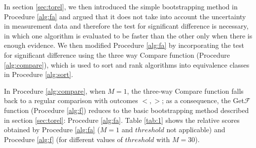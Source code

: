 \documentclass[conference]{IEEEtran}
\newcommand{\p}[1]{{\color{blue} Pdj: #1}}
\begin{document}
In section \ref{sec:torel}, we then introduced the simple bootstrapping method in Procedure \ref{alg:fa} and argued that it does not take into account the uncertainty in measurement data and therefore the test for significant difference is necessary, in which one algorithm is evaluated to be faster than the other only when there is enough evidence. We then modified Procedure \ref{alg:fa} by incorporating the test for significant difference using the three way Compare function (Procedure \ref{alg:compare}), which is used to sort and rank algorithms into equivalence classes in Procedure \ref{alg:sort}. 
 
In Procedure \ref{alg:compare}, when $M = 1$, the three-way Compare function falls back to a regular comparison with
outcomes $< , >$; as a consequence, the Get$\mathcal{F}$ function (Procedure \ref{alg:f}) reduces to the basic bootstrapping method
described in section \ref{sec:torel}: Procedure \ref{alg:fa}.
Table \ref{tab:1} shows the relative scores obtained by Procedure \ref{alg:fa} ($M=1$  and $threshold$ not applicable) and Procedure
\ref{alg:f} (for different values of $threshold$ with $M=30$).
\end{document}
